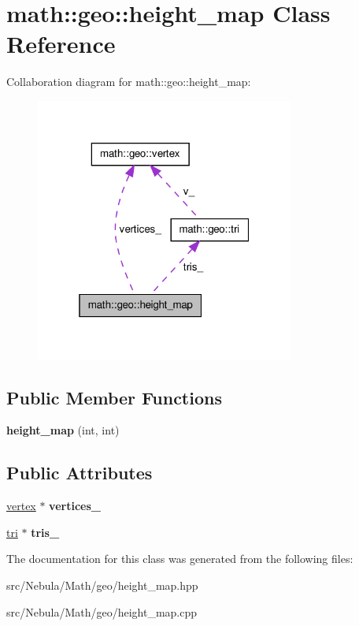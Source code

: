 \hypertarget{classmath_1_1geo_1_1height__map}{\section{math\-:\-:geo\-:\-:height\-\_\-map \-Class \-Reference}
\label{classmath_1_1geo_1_1height__map}
}


\-Collaboration diagram for math\-:\-:geo\-:\-:height\-\_\-map\-:\nopagebreak
\begin{figure}[H]
\begin{center}
\leavevmode
\includegraphics[width=241pt]{classmath_1_1geo_1_1height__map__coll__graph}
\end{center}
\end{figure}
\subsection*{\-Public \-Member \-Functions}
\begin{DoxyCompactItemize}
\item 
\hypertarget{classmath_1_1geo_1_1height__map_a56685f77f9750167f419366039118113}{{\bfseries height\-\_\-map} (int, int)}\label{classmath_1_1geo_1_1height__map_a56685f77f9750167f419366039118113}

\end{DoxyCompactItemize}
\subsection*{\-Public \-Attributes}
\begin{DoxyCompactItemize}
\item 
\hypertarget{classmath_1_1geo_1_1height__map_add2b5f09f8bf6a3d7c674afd0fcb0ee4}{\hyperlink{classmath_1_1geo_1_1vertex}{vertex} $\ast$ {\bfseries vertices\-\_\-}}\label{classmath_1_1geo_1_1height__map_add2b5f09f8bf6a3d7c674afd0fcb0ee4}

\item 
\hypertarget{classmath_1_1geo_1_1height__map_a29abf1041ebd17777d88a2b55ef82535}{\hyperlink{classmath_1_1geo_1_1tri}{tri} $\ast$ {\bfseries tris\-\_\-}}\label{classmath_1_1geo_1_1height__map_a29abf1041ebd17777d88a2b55ef82535}

\end{DoxyCompactItemize}


\-The documentation for this class was generated from the following files\-:\begin{DoxyCompactItemize}
\item 
src/\-Nebula/\-Math/geo/height\-\_\-map.\-hpp\item 
src/\-Nebula/\-Math/geo/height\-\_\-map.\-cpp\end{DoxyCompactItemize}
